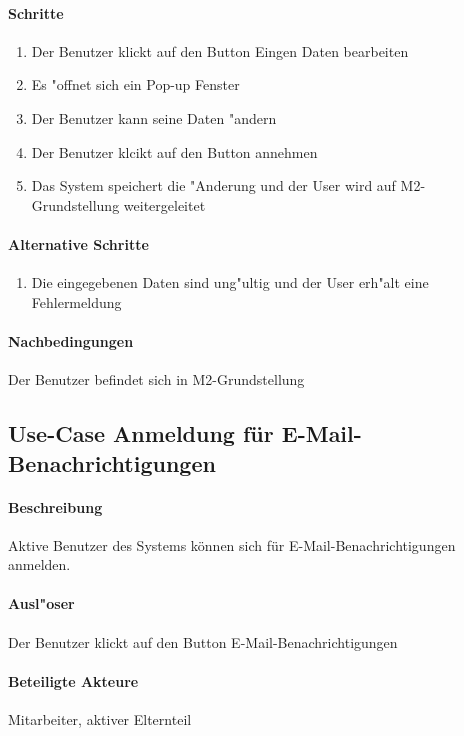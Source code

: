   \paragraph{Schritte}
  \begin{enumerate}
   \item Der Benutzer klickt auf den Button \dq Eingen Daten bearbeiten\dq
   \item Es "offnet sich ein Pop-up Fenster
   \item Der Benutzer kann seine Daten "andern
   \item Der Benutzer klcikt auf den Button \dq annehmen\dq
   \item Das System speichert die "Anderung und der User wird auf M2-Grundstellung weitergeleitet
  \end{enumerate}

  \paragraph{Alternative Schritte}
  \begin{enumerate}
   \item Die eingegebenen Daten sind ung"ultig und der User erh"alt eine Fehlermeldung
  \end{enumerate}

  \paragraph{Nachbedingungen}
  Der Benutzer befindet sich in M2-Grundstellung
  
  
  
  
	\newpage
	\subsection{Use-Case Anmeldung für E-Mail-Benachrichtigungen}
	\paragraph{Beschreibung}
	Aktive Benutzer des Systems können sich für E-Mail-Benachrichtigungen anmelden. 
	\paragraph{Ausl"oser}
	Der Benutzer klickt auf den Button \dq E-Mail-Benachrichtigungen\dq
	\paragraph{Beteiligte Akteure}   \leavevmode \newline
	Mitarbeiter, aktiver Elternteil
